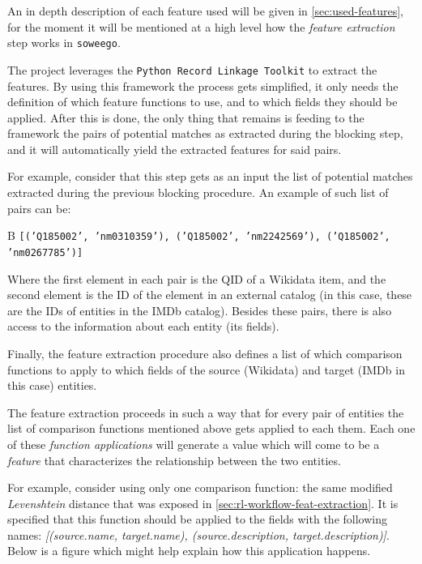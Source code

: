 \documentclass[epsfig,a4paper,11pt,titlepage,twoside,openany]{book}
\begin{document}
An in depth description of each feature used will be given in \autoref{sec:used-features}, for the moment it will be mentioned at a high level how the \textit{feature extraction} step works in \texttt{soweego}. 

The project leverages the \texttt{Python Record Linkage Toolkit} \cite{recordlinkage-library} to extract the features. By using this framework the process gets simplified, it only needs the definition of which feature functions to use, and to which fields they should be applied. 
After this is done, the only thing that remains is feeding to the framework the pairs of potential matches as extracted during the blocking step, and it will automatically yield the extracted features for said pairs.

For example, consider that this step gets as an input the list of potential matches extracted during the previous blocking procedure. An example of such list of pairs can be: 

\begin{center}B
    \texttt{[('Q185002', 'nm0310359'), ('Q185002', 'nm2242569'), ('Q185002', 'nm0267785')]}
\end{center}

Where the first element in each pair is the QID of a Wikidata item, and the second element is the ID of the element in an external catalog (in this case, these are the IDs of entities in the IMDb catalog). Besides these pairs, there is also access to the information about each entity (its fields). 

Finally, the feature extraction procedure also defines a list of which comparison functions to apply to which fields of the source (Wikidata) and target (IMDb in this case) entities.

The feature extraction proceeds in such a way that for every pair of entities the list of comparison functions mentioned above gets applied to each them. Each one of these \textit{function applications} will generate a value which will come to be a \textit{feature} that characterizes the relationship between the two entities.

For example, consider using only one comparison function: the same modified \textit{Levenshtein} distance that was exposed in \autoref{sec:rl-workflow-feat-extraction}. It is specified that this function should be applied to the fields with the following names: \textit{[(source.name, target.name), (source.description, target.description)]}. Below is a figure which might help explain how this application happens.
\end{document}
